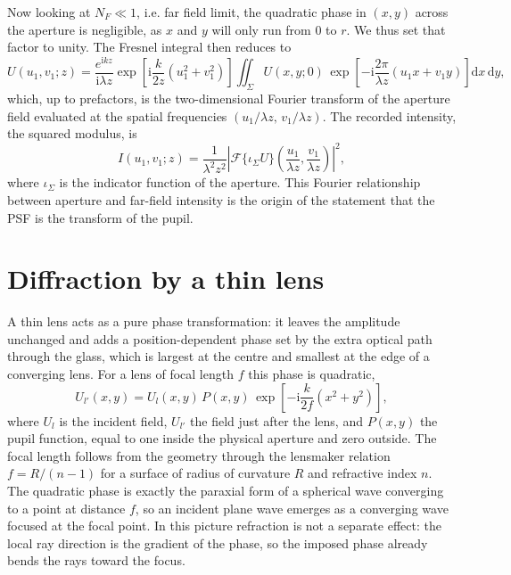 \documentclass[11pt]{book}
\begin{document}
Now looking at $N_F \ll 1$, i.e. far field limit, the quadratic phase in $(x,y)$ across the aperture is negligible, as $x$ and $y$ will only run from 0 to $r$. We thus set that factor to unity. The Fresnel integral then reduces to
\begin{equation}
U(u_1,v_1;z) = \frac{e^{\mathrm{i}kz}}{\mathrm{i}\lambda z}\exp\!\left[\mathrm{i}\frac{k}{2z}(u_1^2+v_1^2)\right]
\iint_\Sigma U(x,y;0)\,\exp\!\left[-\mathrm{i}\frac{2\pi}{\lambda z}(u_1 x + v_1 y)\right]\mathrm{d}x\,\mathrm{d}y,
\label{eq:fraunhofer}
\end{equation}
which, up to prefactors, is the two-dimensional Fourier transform of the aperture field evaluated at the spatial frequencies $(u_1/\lambda z,\,v_1/\lambda z)$. The recorded intensity, the squared modulus, is
\begin{equation}
I(u_1,v_1;z) = \frac{1}{\lambda^2 z^2}\left|\mathcal{F}\{\iota_\Sigma U\}\!\left(\frac{u_1}{\lambda z},\frac{v_1}{\lambda z}\right)\right|^2,
\end{equation}
where $\iota_\Sigma$ is the indicator function of the aperture. This Fourier relationship between aperture and far-field intensity is the origin of the statement that the PSF is the transform of the pupil.

\section{Diffraction by a thin lens}

A thin lens acts as a pure phase transformation: it leaves the amplitude unchanged and adds a position-dependent phase set by the extra optical path through the glass, which is largest at the centre and smallest at the edge of a converging lens. For a lens of focal length $f$ this phase is quadratic,
\begin{equation}
U_{l'}(x,y) = U_l(x,y)\,P(x,y)\,\exp\!\left[-\mathrm{i}\frac{k}{2f}(x^2+y^2)\right],
\label{eq:lens}
\end{equation}
where $U_l$ is the incident field, $U_{l'}$ the field just after the lens, and $P(x,y)$ the pupil function, equal to one inside the physical aperture and zero outside. The focal length follows from the geometry through the lensmaker relation $f = R/(n-1)$ for a surface of radius of curvature $R$ and refractive index $n$. The quadratic phase is exactly the paraxial form of a spherical wave converging to a point at distance $f$, so an incident plane wave emerges as a converging wave focused at the focal point. In this picture refraction is not a separate effect: the local ray direction is the gradient of the phase, so the imposed phase already bends the rays toward the focus.
\end{document}
